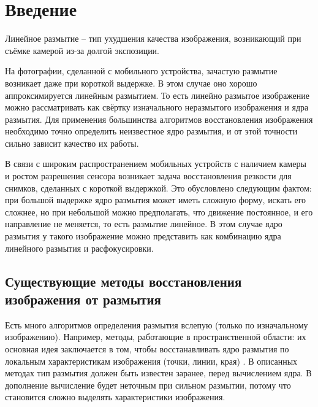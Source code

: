 

\usepackage{comment}





\tableofcontents

\newpage

\pagestyle{fancy}

\rhead{\thepage}
\fancyfoot{}

\section{Введение}
Линейное размытие -- тип ухудшения качества изображения, возникающий при съёмке камерой из-за долгой экспозиции.
\par
На фотографии, сделанной с мобильного устройства, зачастую размытие возникает даже при короткой выдержке. В этом случае оно хорошо аппроксимируется линейным размытием. То есть линейно размытое изображение можно рассматривать как свёртку изначального неразмытого изображения и ядра размытия. Для применения большинства алгоритмов восстановления изображения необходимо точно определить неизвестное ядро размытия, и от этой точности сильно зависит качество их работы.
\par
В связи с широким распространением мобильных устройств с наличием камеры и ростом разрешения сенсора возникает задача восстановления резкости для снимков, сделанных с короткой выдержкой. Это обусловлено следующим фактом: при большой выдержке ядро размытия может иметь сложную форму, искать его сложнее, но при небольшой можно предполагать, что движение постоянное, и его направление не меняется, то есть размытие линейное. В этом случае ядро размытия у такого изображение можно представить как комбинацию ядра линейного размытия и расфокусировки. 


\subsection{Существующие методы восстановления изображения от размытия}
Есть много алгоритмов определения размытия вслепую (только по изначальному изображению). Например, методы, работающие в пространственной области: их основная идея заключается в том, чтобы восстанавливать ядро размытия по локальным характеристикам изображения (точки, линии, края) \cite{kopeika, chalmond, Wu}. В описанных методах тип размытия должен быть известен заранее, перед вычислением ядра. 
В дополнение вычисление будет неточным при сильном размытии, потому что становится сложно выделять характеристики изображения. 

